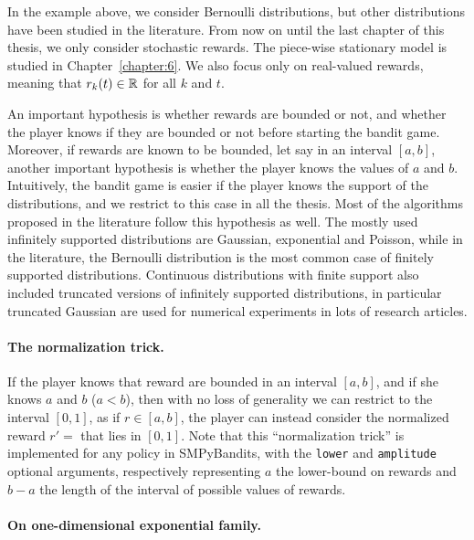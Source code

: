 In the example above, we consider Bernoulli distributions, but other distributions have been studied in the literature.
From now on until the last chapter of this thesis, we only consider stochastic rewards. The piece-wise stationary model is studied in Chapter~\ref{chapter:6}.
%
We also focus only on real-valued rewards, meaning that $r_k(t)\in\mathbb{R}$ for all $k$ and $t$.

An important hypothesis is whether rewards are bounded or not,
and whether the player knows if they are bounded or not before starting the bandit game.
Moreover, if rewards are known to be bounded, let say in an interval $[a,b]$, another important hypothesis is whether the player knows the values of $a$ and $b$.
%
Intuitively, the bandit game is easier if the player knows the support of the distributions, and we restrict to this case in all the thesis.
Most of the algorithms proposed in the literature follow this hypothesis as well.
%
The mostly used
infinitely supported distributions are Gaussian, exponential and Poisson,
while in the literature, the Bernoulli distribution is the most common case of finitely supported distributions.
Continuous distributions with finite support also included truncated versions of infinitely supported distributions, in particular truncated Gaussian are used for numerical experiments in lots of research articles.

\paragraph{The normalization trick.}
%
If the player knows that reward are bounded in an interval $[a,b]$, and if she knows $a$ and $b$ ($a<b$), then with no loss of generality we can restrict to the interval $[0,1]$, as if $r\in[a,b]$, the player can instead consider the normalized reward $r' = $ that lies in $[0,1]$.
Note that this ``normalization trick'' is implemented for any policy in SMPyBandits, with the \texttt{lower} and \texttt{amplitude} optional arguments, respectively representing $a$ the lower-bound on rewards and $b-a$ the length of the interval of possible values of rewards.


\paragraph{On one-dimensional exponential family.}
%

